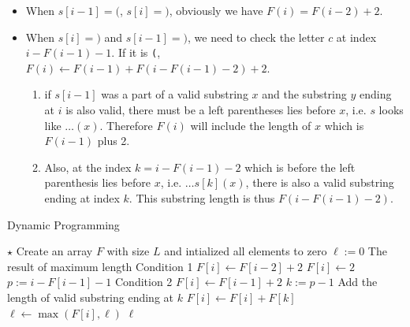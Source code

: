 \begin{itemize}
\item When $s[i-1]=\texttt{(}$, $s[i]=\texttt{)}$, obviously we have $F(i) = F(i-2)+2$. 
\item When $s[i] = \text{)}$ and $s[i-1] = \text{)}$, we need to check the letter $c$ at index $i-F(i-1)-1$. If it is \texttt{(}, $F(i)\gets F(i-1) +  F(i-F(i-1)-2)+2$.
\begin{enumerate}
\item if $s[i-1]$ was a part of a valid substring $x$ and the substring $y$ ending at $i$ is also valid, there must be a left parentheses lies before $x$, i.e. $s$ looks like  $\ldots(x)$. Therefore $F(i)$ will include the length of $x$ which is $F(i-1)$ plus 2.
\item Also, at the index $k = i - F(i-1) - 2$ which is before the left parenthesis lies before $x$, i.e. $\ldots s[k](x)$, there is also a valid substring ending at index $k$. This substring length is thus $F(i - F(i-1)-2)$.
\end{enumerate}
\end{itemize}

\setcounter{algorithm}{0}
\begin{algorithm}[H]
\caption{Dynamic Programming}
\begin{algorithmic}[1]
\State $\star$ Create an array $F$ with size $L$ and intialized all elements to zero
\State $\ell:=0$ \Comment The result of maximum length
 \Comment Condition 1
\State $F[i] \gets F[i-2]+2 $
\Else
\State $F[i]\gets 2$
\EndIf
\Else 
\State $p := i - F[i-1] - 1$
 \Comment Condition 2
\State $F[i] \gets F[i-1]+2 $
\State $k := p-1$
 \Comment Add the length of valid substring ending at $k$
\State $F[i] \gets F[i] + F[k]$
\EndIf
\EndIf
\EndIf
\EndIf
\State $\ell \gets \max\left(F[i], \ell\right)$
\EndFor
\State \Return $\ell$
\EndProcedure
\end{algorithmic}
\end{algorithm}

